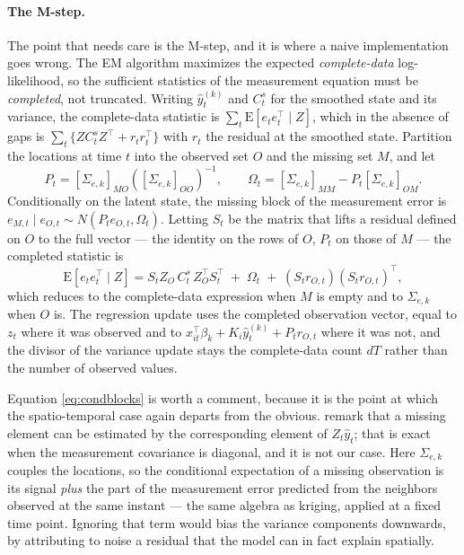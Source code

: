 \paragraph{The M-step.} The point that needs care is the M-step, and it is where a naive implementation goes wrong. The EM algorithm maximizes the expected \emph{complete-data} log-likelihood, so the sufficient statistics of the measurement equation must be \emph{completed}, not truncated. Writing $\hat{y}^{(k)}_t$ and $C^s_t$ for the smoothed state and its variance, the complete-data statistic is $\sum_t \mathrm{E}\!\left[e_t e_t^\top \mid Z\right]$, which in the absence of gaps is $\sum_t \{Z C^s_t Z^\top + r_t r_t^\top\}$ with $r_t$ the residual at the smoothed state. Partition the locations at time $t$ into the observed set $O$ and the missing set $M$, and let
\begin{equation}\label{eq:condblocks}
  P_t = \left[\Sigma_{e,k}\right]_{MO} \left(\left[\Sigma_{e,k}\right]_{OO}\right)^{-1},
  \qquad
  \Omega_t = \left[\Sigma_{e,k}\right]_{MM} - P_t \left[\Sigma_{e,k}\right]_{OM}.
\end{equation}
Conditionally on the latent state, the missing block of the measurement error is $e_{M,t} \mid e_{O,t} \sim N(P_t e_{O,t}, \Omega_t)$. Letting $S_t$ be the matrix that lifts a residual defined on $O$ to the full vector --- the identity on the rows of $O$, $P_t$ on those of $M$ --- the completed statistic is
\begin{equation}\label{eq:BBmissing}
  \mathrm{E}\!\left[e_t e_t^\top \mid Z\right]
  = S_t Z_O\, C^s_t\, Z_O^\top S_t^\top \;+\; \Omega_t \;+\; \left(S_t r_{O,t}\right)\left(S_t r_{O,t}\right)^{\top},
\end{equation}
which reduces to the complete-data expression when $M$ is empty and to $\Sigma_{e,k}$ when $O$ is. The regression update uses the completed observation vector, equal to $z_t$ where it was observed and to $x_{it}^\top \beta_k + K_i \hat{y}^{(k)}_t + P_t r_{O,t}$ where it was not, and the divisor of the variance update stays the complete-data count $dT$ rather than the number of observed values.

Equation \eqref{eq:condblocks} is worth a comment, because it is the point at which the spatio-temporal case again departs from the obvious. \citet{DurbinKoopman2012} remark that a missing element can be estimated by the corresponding element of $Z_t \hat{y}_t$; that is exact when the measurement covariance is diagonal, and it is not our case. Here $\Sigma_{e,k}$ couples the locations, so the conditional expectation of a missing observation is its signal \emph{plus} the part of the measurement error predicted from the neighbors observed at the same instant --- the same algebra as kriging, applied at a fixed time point. Ignoring that term would bias the variance components downwards, by attributing to noise a residual that the model can in fact explain spatially.

